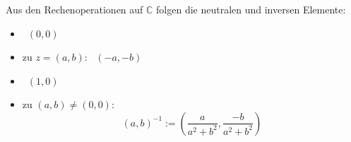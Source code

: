 Aus den Rechenoperationen auf $\mathbb{C}$ folgen die neutralen und inversen Elemente:
\begin{itemize}[label="",leftmargin=0pt]
    \item {} \, $(0, 0)$
    \item {} zu $z = (a, b)$: \, $(-a, -b)$
    \item {} \, $(1, 0)$
    \item {} zu $(a, b) \neq (0, 0)$:
    $$(a, b)^{-1} := \left(\frac{a}{a^2+b^2}, \frac{-b}{a^2+b^2}\right)$$
\end{itemize}